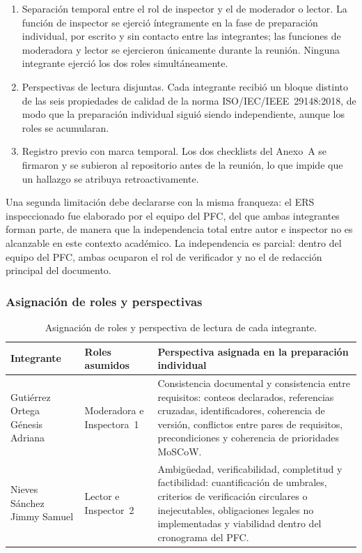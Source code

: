 \documentclass[journal,onecolumn]{IEEEtran}
\begin{document}
	\begin{enumerate}
		\item Separación temporal entre el rol de inspector y el de moderador o
		lector. La función de inspector se ejerció íntegramente en la fase de
		preparación individual, por escrito y sin contacto entre las
		integrantes; las funciones de moderadora y lector se ejercieron
		únicamente durante la reunión. Ninguna integrante ejerció los dos roles
		simultáneamente.
		
		\item Perspectivas de lectura disjuntas. Cada integrante recibió un
		bloque distinto de las seis propiedades de calidad de la norma
		ISO/IEC/IEEE~29148:2018, de modo que la preparación individual siguió
		siendo independiente, aunque los roles se acumularan.
		
		\item Registro previo con marca temporal. Los dos checklists del
		Anexo~A se firmaron y se subieron al repositorio antes de la reunión, lo
		que impide que un hallazgo se atribuya retroactivamente.
	\end{enumerate}
	
	Una segunda limitación debe declararse con la misma franqueza: el ERS
	inspeccionado fue elaborado por el equipo del PFC, del que ambas integrantes
	forman parte, de manera que la independencia total entre autor e inspector no
	es alcanzable en este contexto académico. La independencia es parcial:
	dentro del equipo del PFC, ambas ocuparon el rol de verificador y no el de
	redacción principal del documento.
	
	\subsubsection{Asignación de roles y perspectivas}
	
	\begin{table}[h!]
		\centering
		\caption{Asignación de roles y perspectiva de lectura de cada integrante.}
		\label{tab:asignacion-roles}
		\begin{tabular}{
				>{\raggedright\arraybackslash}p{4.3cm}
				>{\raggedright\arraybackslash}p{3cm}
				>{\raggedright\arraybackslash}p{6.6cm}
			}
			\toprule
			\textbf{Integrante} & \textbf{Roles asumidos} & \textbf{Perspectiva asignada en la preparación individual} \\
			\midrule
			Gutiérrez Ortega Génesis Adriana & Moderadora e Inspectora~1 &
			Consistencia documental y consistencia entre requisitos: conteos
			declarados, referencias cruzadas, identificadores, coherencia de
			versión, conflictos entre pares de requisitos, precondiciones y
			coherencia de prioridades MoSCoW. \\
			\addlinespace
			Nieves Sánchez Jimmy Samuel & Lector e Inspector~2 &
			Ambigüedad, verificabilidad, completitud y factibilidad:
			cuantificación de umbrales, criterios de verificación circulares o
			inejecutables, obligaciones legales no implementadas y viabilidad
			dentro del cronograma del PFC. \\
			\bottomrule
		\end{tabular}
	\end{table}
	
\end{document}
